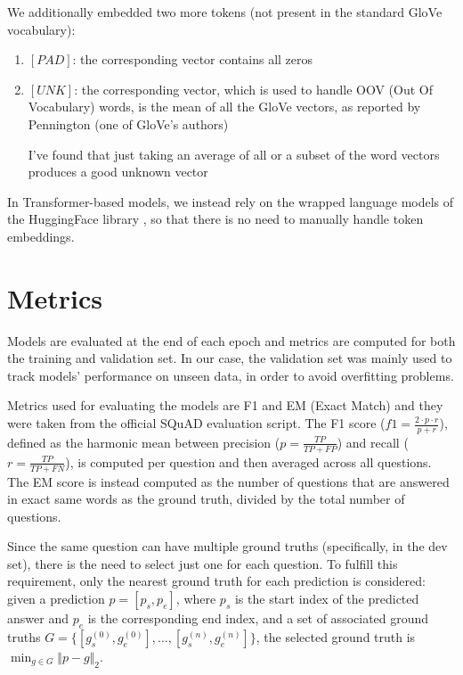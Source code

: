 \documentclass[a4paper,10pt]{report}
\begin{document}
We additionally embedded two more tokens (not present in the standard GloVe vocabulary):
\begin{enumerate}
  \item $[PAD]$: the corresponding vector contains all zeros
  \item $[UNK]$: the corresponding vector, which is used to handle OOV (Out Of Vocabulary) words, is the mean of all the GloVe vectors, as reported by Pennington (one of GloVe's authors) 
  \begin{displayquote}I've found that just taking an average of all or a subset of the word vectors produces a good unknown vector \end{displayquote}
\end{enumerate}

In Transformer-based models, we instead rely on the wrapped language models of the HuggingFace library \cite{hugginface}, so that there is no need to manually handle token embeddings.

\section{Metrics}
Models are evaluated at the end of each epoch and metrics are computed for both the training and validation set. In our case, the validation set was mainly used to track models' performance on unseen data, in order to avoid overfitting problems.

Metrics used for evaluating the models are F1 and EM (Exact Match) and they were taken from the official SQuAD evaluation script. The F1 score ($f1=\frac{2\cdot p \cdot r}{p+r}$), defined as the harmonic mean between precision ($p=\frac{TP}{TP+FP}$) and recall ($r=\frac{TP}{TP+FN}$), is computed per question and then averaged across all questions. The EM score is instead computed as the number of questions that are answered in exact same words as the ground truth, divided by the total number of questions.

Since the same question can have multiple ground truths (specifically, in the dev set), there is the need to select just one for each question. To fulfill this requirement, only the nearest ground truth for each prediction is considered: given a prediction $p=[p_s, p_e]$, where $p_s$ is the start index of the predicted answer and $p_e$ is the corresponding end index, and a set of associated ground truths $G=\{[g_s^{(0)},g_e^{(0)}], \dots, [g_s^{(n)},g_e^{(n)}]\}$, the selected ground truth is $\min_{g\in G}\Vert p - g\Vert_2$. 
\end{document}
